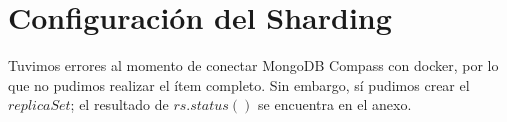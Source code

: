 \section{Configuración del Sharding}

Tuvimos errores al momento de conectar MongoDB Compass con docker, por lo que no pudimos realizar el ítem completo.
Sin embargo, sí pudimos crear el $replicaSet$; el resultado de $rs.status()$ se encuentra en el anexo.